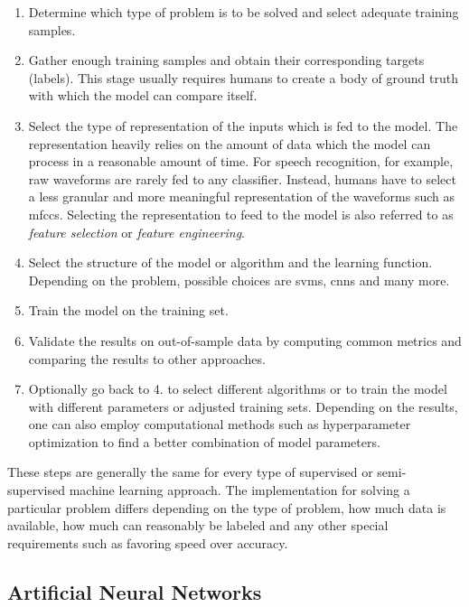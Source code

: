 \documentclass[final]{vutinfth} %
\begin{document}
\begin{enumerate}
\item Determine which type of problem is to be solved and select
  adequate training samples.
\item Gather enough training samples and obtain their corresponding
  targets (labels). This stage usually requires humans to create a
  body of ground truth with which the model can compare itself.
\item Select the type of representation of the inputs which is fed to
  the model. The representation heavily relies on the amount of data
  which the model can process in a reasonable amount of time. For
  speech recognition, for example, raw waveforms are rarely fed to any
  classifier. Instead, humans have to select a less granular and more
  meaningful representation of the waveforms such as
  \glspl{mfcc}. Selecting the representation to feed to the model is
  also referred to as \emph{feature selection} or \emph{feature
  engineering}.
\item Select the structure of the model or algorithm and the learning
  function. Depending on the problem, possible choices are
  \glspl{svm}, \glspl{cnn} and many more.
\item Train the model on the training set.
\item Validate the results on out-of-sample data by computing common
  metrics and comparing the results to other approaches.
\item Optionally go back to 4. to select different algorithms or to
  train the model with different parameters or adjusted training
  sets. Depending on the results, one can also employ computational
  methods such as hyperparameter optimization to find a better
  combination of model parameters.
\end{enumerate}

These steps are generally the same for every type of supervised or
semi-supervised machine learning approach. The implementation for
solving a particular problem differs depending on the type of problem,
how much data is available, how much can reasonably be labeled and any
other special requirements such as favoring speed over accuracy.

\subsection{Artificial Neural Networks}
\label{ssec:theory-nn}
\end{document}
